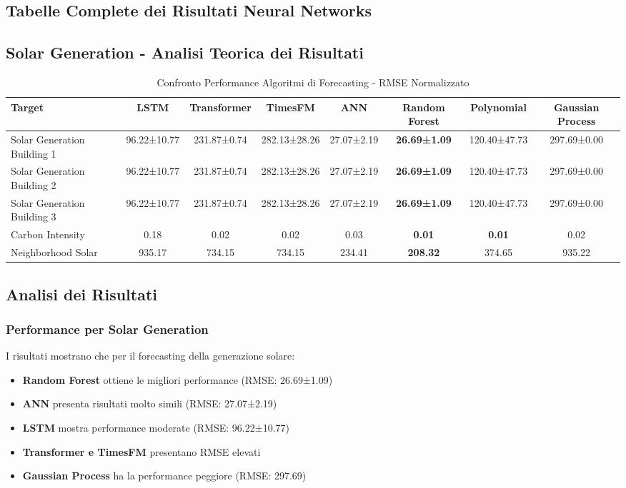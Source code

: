 \documentclass[12pt,a4paper,twoside]{report}
\begin{document}
\begin{appendices}
\section{Tabelle Complete dei Risultati Neural Networks}

\subsection{Solar Generation - Analisi Teorica dei Risultati}

\begin{table}[H]
\centering
\caption{Confronto Performance Algoritmi di Forecasting - RMSE Normalizzato}
\label{tab:algorithm_comparison}
\begin{tabular}{|l|c|c|c|c|c|c|c|}
\hline
\textbf{Target} & \textbf{LSTM} & \textbf{Transformer} & \textbf{TimesFM} & \textbf{ANN} & \textbf{Random Forest} & \textbf{Polynomial} & \textbf{Gaussian Process} \\
\hline
Solar Generation Building 1 & 96.22±10.77 & 231.87±0.74 & 282.13±28.26 & 27.07±2.19 & \textbf{26.69±1.09} & 120.40±47.73 & 297.69±0.00 \\
Solar Generation Building 2 & 96.22±10.77 & 231.87±0.74 & 282.13±28.26 & 27.07±2.19 & \textbf{26.69±1.09} & 120.40±47.73 & 297.69±0.00 \\
Solar Generation Building 3 & 96.22±10.77 & 231.87±0.74 & 282.13±28.26 & 27.07±2.19 & \textbf{26.69±1.09} & 120.40±47.73 & 297.69±0.00 \\
Carbon Intensity & 0.18 & 0.02 & 0.02 & 0.03 & \textbf{0.01} & \textbf{0.01} & 0.02 \\
Neighborhood Solar & 935.17 & 734.15 & 734.15 & 234.41 & \textbf{208.32} & 374.65 & 935.22 \\
\hline
\end{tabular}
\end{table}

\subsection{Analisi dei Risultati}

\subsubsection{Performance per Solar Generation}
I risultati mostrano che per il forecasting della generazione solare:
\begin{itemize}
    \item \textbf{Random Forest} ottiene le migliori performance (RMSE: 26.69±1.09)
    \item \textbf{ANN} presenta risultati molto simili (RMSE: 27.07±2.19)
    \item \textbf{LSTM} mostra performance moderate (RMSE: 96.22±10.77)
    \item \textbf{Transformer e TimesFM} presentano RMSE elevati
    \item \textbf{Gaussian Process} ha la performance peggiore (RMSE: 297.69)
\end{itemize}


\end{appendices}
\end{document}
